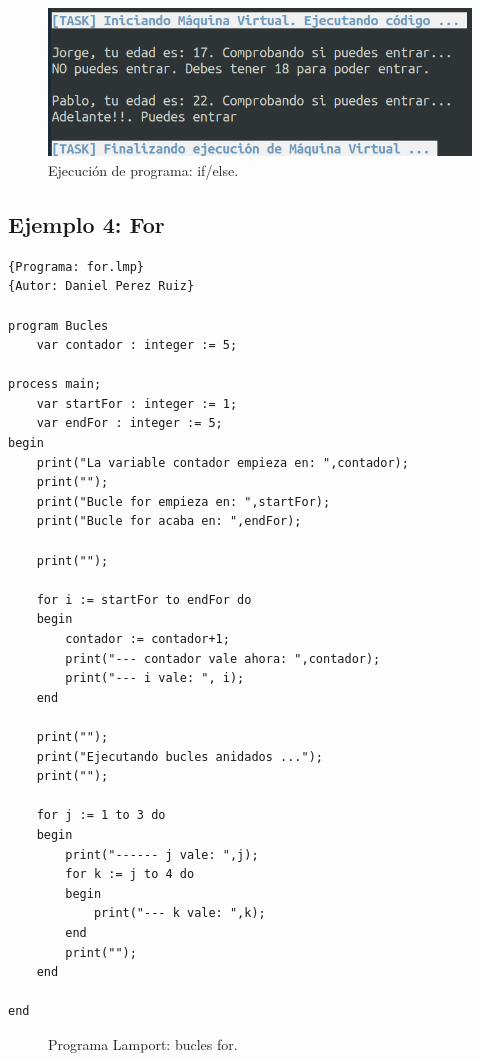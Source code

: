 \newpage
\begin{figure}[h]
    \includegraphics[width=\linewidth]{images/ejemplos/if_else.png}
    \caption{Ejecución de programa: if/else.}
    \label{fig:lamportIfElse_exec}
\end{figure}

\newpage
\subsection{Ejemplo 4: For}
\begin{lstlisting}[style=lamportStyle]
{Programa: for.lmp}
{Autor: Daniel Perez Ruiz}

program Bucles
	var contador : integer := 5;

process main;
	var startFor : integer := 1;
	var endFor : integer := 5;
begin
	print("La variable contador empieza en: ",contador);
	print("");
	print("Bucle for empieza en: ",startFor);
	print("Bucle for acaba en: ",endFor);
	
	print("");
	
	for i := startFor to endFor do
	begin
		contador := contador+1;
		print("--- contador vale ahora: ",contador);
		print("--- i vale: ", i);
	end
	
	print("");
	print("Ejecutando bucles anidados ...");
	print("");
	
	for j := 1 to 3 do
	begin
		print("------ j vale: ",j);
		for k := j to 4 do
		begin
			print("--- k vale: ",k);
		end
		print("");
	end
	
end
\end{lstlisting}
\begin{figure}[h]
\caption{Programa Lamport: bucles for.}
\label{fig:lamportFor}
\end{figure}

